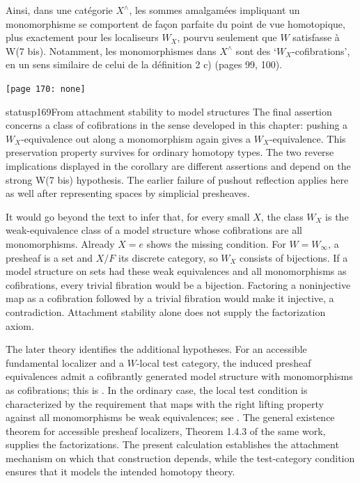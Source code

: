 Ainsi, dans une catégorie $X^\wedge$, les sommes amalgamées impliquant un monomorphisme se comportent de façon parfaite du point de vue homotopique, plus exactement pour les localiseurs $W_X$, pourvu  seulement que $W$ satisfasse à W(7 bis). Notamment, les monomorphismes dans $X^\wedge$ sont des ‘$W_X$-cofibrations’, en un sens similaire de celui de la définition 2 c) (pages 99, 100).

\texttt{[page 170: none]}


\begin{dcomment}{status}{p169}{From attachment stability to model structures}
The final assertion concerns a class of cofibrations in the sense developed in this chapter: pushing a $W_X$-equivalence out along a monomorphism again gives a $W_X$-equivalence. This preservation property survives for ordinary homotopy types. The two reverse implications displayed in the corollary are different assertions and depend on the strong W(7 bis) hypothesis. The earlier failure of pushout reflection applies here as well after representing spaces by simplicial presheaves.

It would go beyond the text to infer that, for every small $X$, the class $W_X$ is the weak-equivalence class of a model structure whose cofibrations are all monomorphisms. Already $X=e$ shows the missing condition. For $W=W_\infty$, a presheaf is a set and $X/F$ its discrete category, so $W_X$ consists of bijections. If a model structure on sets had these weak equivalences and all monomorphisms as cofibrations, every trivial fibration would be a bijection. Factoring a noninjective map as a cofibration followed by a trivial fibration would make it injective, a contradiction. Attachment stability alone does not supply the factorization axiom.

The later theory identifies the additional hypotheses. For an accessible fundamental localizer and a $W$-local test category, the induced presheaf equivalences admit a cofibrantly generated model structure with monomorphisms as cofibrations; this is \citet[Corollary 4.2.18]{Cisinski2006}. In the ordinary case, the local test condition is characterized by the requirement that maps with the right lifting property against all monomorphisms be weak equivalences; see \citet[Theorem 4.1.19]{Cisinski2006}. The general existence theorem for accessible presheaf localizers, Theorem 1.4.3 of the same work, supplies the factorizations. The present calculation establishes the attachment mechanism on which that construction depends, while the test-category condition ensures that it models the intended homotopy theory.
\end{dcomment}
